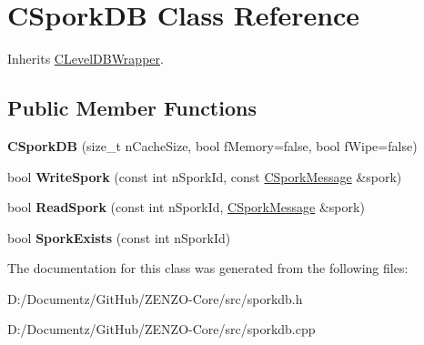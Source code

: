 \hypertarget{class_c_spork_d_b}{}\section{C\+Spork\+DB Class Reference}
\label{class_c_spork_d_b}


Inherits \mbox{\hyperlink{class_c_level_d_b_wrapper}{C\+Level\+D\+B\+Wrapper}}.

\subsection*{Public Member Functions}
\begin{DoxyCompactItemize}
\item 
\mbox{\label{class_c_spork_d_b_a85a36bd2aa74e2cd1522ed49e661484f}} 
{\bfseries C\+Spork\+DB} (size\+\_\+t n\+Cache\+Size, bool f\+Memory=false, bool f\+Wipe=false)
\item 
\mbox{\label{class_c_spork_d_b_a642de787a3b991b3ce7d33125ca19828}} 
bool {\bfseries Write\+Spork} (const int n\+Spork\+Id, const \mbox{\hyperlink{class_c_spork_message}{C\+Spork\+Message}} \&spork)
\item 
\mbox{\label{class_c_spork_d_b_a346e545c337070e9f7827c4eb1abcdb1}} 
bool {\bfseries Read\+Spork} (const int n\+Spork\+Id, \mbox{\hyperlink{class_c_spork_message}{C\+Spork\+Message}} \&spork)
\item 
\mbox{\label{class_c_spork_d_b_ae86fb3937491e8509a5d2b7d5b8dbc53}} 
bool {\bfseries Spork\+Exists} (const int n\+Spork\+Id)
\end{DoxyCompactItemize}


The documentation for this class was generated from the following files\+:\begin{DoxyCompactItemize}
\item 
D\+:/\+Documentz/\+Git\+Hub/\+Z\+E\+N\+Z\+O-\/\+Core/src/sporkdb.\+h\item 
D\+:/\+Documentz/\+Git\+Hub/\+Z\+E\+N\+Z\+O-\/\+Core/src/sporkdb.\+cpp\end{DoxyCompactItemize}

